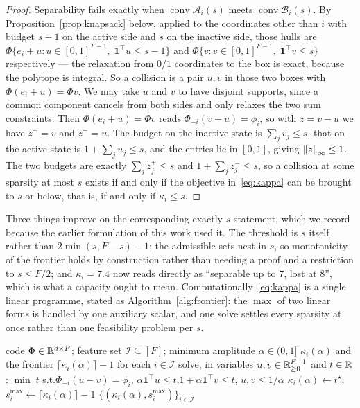 \begin{proof}
Separability fails exactly when $\operatorname{conv}\mathcal A_i(s)$ meets
$\operatorname{conv}\mathcal B_i(s)$. By Proposition~\ref{prop:knapsack} below, applied to the
coordinates other than $i$ with budget $s-1$ on the active side and $s$ on the inactive side,
those hulls are $\Phi\{e_i+u:u\in[0,1]^{F-1},\;\mathbf 1^{\top}u\le s-1\}$ and
$\Phi\{v:v\in[0,1]^{F-1},\;\mathbf 1^{\top}v\le s\}$ respectively --- the relaxation from
$0/1$ coordinates to the box is exact, because the polytope is integral. So a collision is a
pair $u,v$ in those two boxes with $\Phi(e_i+u)=\Phi v$. We may take $u$ and $v$ to have
disjoint supports, since a common component cancels from both sides and only relaxes the two sum
constraints. Then
$\Phi(e_i+u)=\Phi v$ reads $\Phi_{-i}(v-u)=\phi_i$, so with $z=v-u$ we have $z^{+}=v$ and
$z^{-}=u$. The budget on the inactive state is $\sum_j v_j\le s$, that on the active state is
$1+\sum_j u_j\le s$, and the entries lie in $[0,1]$, giving $\left\lVert z \right\rVert_\infty\le1$. The two
budgets are exactly $\sum_jz^{+}_j\le s$ and $1+\sum_jz^{-}_j\le s$, so a collision at some
sparsity at most $s$ exists if and only if the objective in~\eqref{eq:kappa} can be brought to
$s$ or below, that is, if and only if $\kappa_i\le s$.
\end{proof}

Three things improve on the corresponding exactly-$s$ statement, which we record because the
earlier formulation of this work used it. The threshold is $s$ itself rather than
$2\min(s,F-s)-1$; the admissible sets nest in $s$, so monotonicity of the frontier holds by
construction rather than needing a proof and a restriction to $s\le F/2$; and $\kappa_i=7.4$ now
reads directly as ``separable up to $7$, lost at $8$'', which is what a capacity ought to mean.
Computationally~\eqref{eq:kappa} is a single linear programme, stated as
Algorithm~\ref{alg:frontier}: the $\max$ of two linear forms is handled by one auxiliary scalar,
and one solve settles every sparsity at once rather than one feasibility problem per $s$.

\begin{algorithm}[t]
\caption{\textsc{CollisionFrontier} --- the largest affinely separable sparsity, per feature}
\label{alg:frontier}
\begin{algorithmic}[1]
\Require code $\Phi\in\mathbb{R}^{d\times F}$; feature set $\mathcal I\subseteq[F]$; minimum amplitude
  $\alpha\in(0,1]$
\Ensure $\kappa_i(\alpha)$ and the frontier $\lceil\kappa_i(\alpha)\rceil-1$ for each
  $i\in\mathcal I$
  \State solve, in variables $u,v\in\mathbb{R}^{F-1}_{\ge0}$ and $t\in\mathbb{R}$:
  \Statex \qquad $\min\;t$ \quad s.t.\quad $\Phi_{-i}(u-v)=\phi_i$,\quad
    $\alpha\mathbf 1^{\top}u\le t$,\quad $1+\alpha\mathbf 1^{\top}v\le t$,\quad
    $u,v\le1/\alpha$
  \State $\kappa_i(\alpha)\gets t^{\star}$;\quad
    $s_i^{\max}\gets\lceil\kappa_i(\alpha)\rceil-1$
\EndFor
\State \Return $\{(\kappa_i(\alpha),s_i^{\max})\}_{i\in\mathcal I}$
\end{algorithmic}
\end{algorithm}


